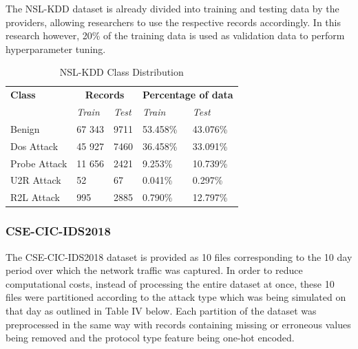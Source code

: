 \documentclass[conference]{IEEEtran}
\begin{document}
\noindent The NSL-KDD dataset is already divided into training and testing data by the providers, allowing researchers to use the respective records accordingly. In this research however, 20\% of the training data is used as validation data to perform hyperparameter tuning. \\

\begin{table}[htbp]
\caption{NSL-KDD Class Distribution}
\begin{center}
\begin{tabular}{|p{1.75cm}|p{1cm}|p{1cm}|p{1cm}|p{1cm}|}
\hline
\textbf{Class} &
\multicolumn{2}{|c|}{\textbf{Records}} &
\multicolumn{2}{|c|}{\textbf{Percentage of data}}
\\
\cline{2-5}
 & \textit{Train}& \textit{Test}&\textit{Train}& \textit{Test}\\[2pt]
\hline
Benign & 67 343 & 9711 & 53.458\% & 43.076\% \\[5pt]
\hline
Dos Attack & 45 927 & 7460 & 36.458\% & 33.091\% \\[5pt]
\hline
Probe Attack & 11 656 & 2421 & 9.253\% & 10.739\% \\[5pt]
\hline
U2R Attack & 52 & 67 & 0.041\% & 0.297\% \\[5pt]
\hline
R2L Attack & 995 & 2885 & 0.790\% & 12.797\% \\[5pt]
\hline
\end{tabular}
\label{tab1}
\end{center}
\end{table}


\subsubsection{CSE-CIC-IDS2018}
\noindent The CSE-CIC-IDS2018 dataset is provided as 10 files corresponding to the 10 day period over which the network traffic was captured. In order to reduce computational costs, instead of processing the entire dataset at once, these 10 files were partitioned according to the attack type which was being simulated on that day as outlined in Table IV below. Each partition of the dataset was preprocessed in the same way with records containing missing or erroneous values being removed and the protocol type feature being one-hot encoded. \\
\end{document}
